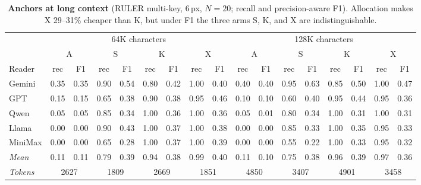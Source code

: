 \begin{table}[!htbp]
\centering
\caption{\textbf{Anchors at long context} (RULER multi-key, 6\,px, $N{=}20$; recall and precision-aware F1). Allocation makes X 29--31\% cheaper than K, but under F1 the three arms S, K, and X are indistinguishable.}
\label{tab:app_longkx}
\footnotesize
\setlength{\tabcolsep}{3pt}
\begin{tabular}{l cccccccccccccccc}
\toprule
& \multicolumn{8}{c}{64K characters} & \multicolumn{8}{c}{128K characters} \\
\cmidrule(lr){2-9}\cmidrule(lr){10-17}
& \multicolumn{2}{c}{A} & \multicolumn{2}{c}{S} & \multicolumn{2}{c}{K} & \multicolumn{2}{c}{X} & \multicolumn{2}{c}{A} & \multicolumn{2}{c}{S} & \multicolumn{2}{c}{K} & \multicolumn{2}{c}{X} \\
Reader & rec & F1 & rec & F1 & rec & F1 & rec & F1 & rec & F1 & rec & F1 & rec & F1 & rec & F1 \\
\midrule
Gemini & 0.35 & 0.35 & 0.90 & 0.54 & 0.80 & 0.42 & 1.00 & 0.40 & 0.40 & 0.40 & 0.95 & 0.63 & 0.85 & 0.50 & 1.00 & 0.47 \\
GPT & 0.15 & 0.15 & 0.65 & 0.38 & 0.90 & 0.38 & 0.95 & 0.46 & 0.10 & 0.10 & 0.60 & 0.40 & 0.95 & 0.44 & 0.95 & 0.36 \\
Qwen & 0.05 & 0.05 & 0.85 & 0.34 & 1.00 & 0.36 & 1.00 & 0.36 & 0.05 & 0.01 & 0.80 & 0.34 & 1.00 & 0.31 & 1.00 & 0.31 \\
Llama & 0.00 & 0.00 & 0.90 & 0.43 & 1.00 & 0.37 & 1.00 & 0.38 & 0.00 & 0.00 & 0.85 & 0.33 & 1.00 & 0.35 & 0.95 & 0.33 \\
MiniMax & 0.00 & 0.00 & 0.65 & 0.28 & 1.00 & 0.37 & 1.00 & 0.39 & 0.00 & 0.00 & 0.55 & 0.22 & 1.00 & 0.33 & 0.95 & 0.32 \\
\midrule
\textit{Mean} & 0.11 & 0.11 & 0.79 & 0.39 & 0.94 & 0.38 & 0.99 & 0.40 & 0.11 & 0.10 & 0.75 & 0.38 & 0.96 & 0.39 & 0.97 & 0.36 \\
\textit{Tokens} & \multicolumn{2}{c}{2627} & \multicolumn{2}{c}{1809} & \multicolumn{2}{c}{2669} & \multicolumn{2}{c}{1851} & \multicolumn{2}{c}{4850} & \multicolumn{2}{c}{3407} & \multicolumn{2}{c}{4901} & \multicolumn{2}{c}{3458} \\
\bottomrule
\end{tabular}
\end{table}

